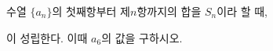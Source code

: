 \hspace*{2mm}\begin{minipage}[t]{\dimexpr\linewidth-2mm\relax}\vspace{0pt}
수열 $\{a_n\}$의 첫째항부터 제$n$항까지의 합을 $S_n$이라 할 때, \par\smallskip{}\par\smallskip\noindent 이 성립한다. 이때 $a_6$의 값을 구하시오.\end{minipage}
